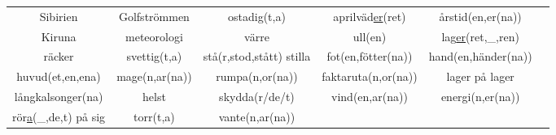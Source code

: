 \begin{center}
\begin{adjustwidth}{-2.5cm}{}
\begin{tabular}{|c c c c c c|}
            Sibirien & Golfströmmen & ostadig(t,a) & aprilväd\underline{er}(ret) & årstid(en,er(na)) &  \\
            Kiruna & meteorologi & värre & ull(en) & lag\underline{er}(ret,\_,ren) &  \\
            räcker & svettig(t,a) & stå(r,stod,stått) stilla & fot(en,fötter(na)) & hand(en,händer(na)) &  \\
            huvud(et,en,ena) & mage(n,ar(na)) & rumpa(n,or(na)) & faktaruta(n,or(na)) & lager på lager &  \\
            långkalsonger(na) & helst & skydda(r/de/t) & vind(en,ar(na)) & energi(n,er(na)) &  \\
            rör\underline{a}(\_,de,t) på sig & torr(t,a) & vante(n,ar(na)) &  &  &  \\
            \hline
        \end{tabular}
    \end{adjustwidth}
\end{center}

